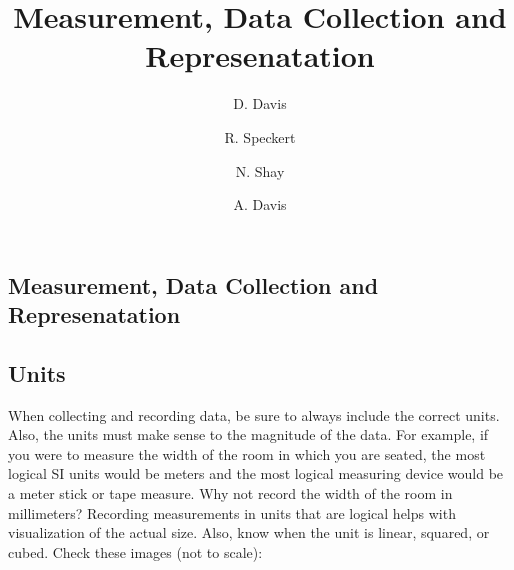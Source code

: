\documentclass{ximera}
\author{D. Davis \and R. Speckert \and N. Shay \and A. Davis}
\title{Measurement, Data Collection and Represenatation} \license{CC BY-NC-SA 4.0}
\begin{document}
\begin{abstract}
\end{abstract}
\maketitle

\begin{onlineOnly}
\section*{Measurement, Data Collection and Represenatation}
\end{onlineOnly}

\subsection*{Units}
When collecting and recording data, be sure to always include the correct units.  Also, the units must make sense to the magnitude of the data.  For example, if you were to measure the width of the room in which you are seated, the most logical SI units would be meters and the most logical measuring device would be a meter stick or tape measure.  
Why not record the width of the room in millimeters?  
Recording measurements in units that are logical helps with visualization of the actual size.  
Also, know when the unit is linear, squared, or cubed.   Check these images (not to scale):
\end{document}
